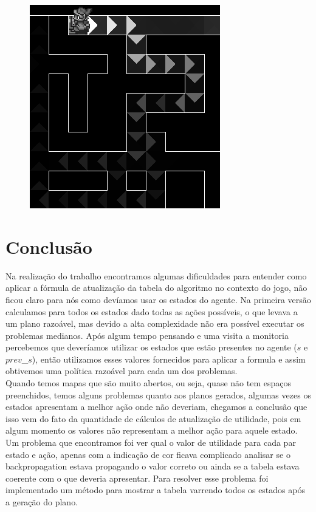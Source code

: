 \documentclass[letterpaper]{article}
\begin{document}
\begin{figure}[ht]
\centering
\includegraphics[scale=0.5]{medium.png}
\caption{}
\label{map_medium}
\end{figure}
\newpage{}
\section{Conclusão}

Na realização do trabalho encontramos algumas dificuldades para entender como aplicar a fórmula de atualização da tabela do algoritmo no contexto do jogo, não ficou claro para nós como devíamos usar os estados do agente. Na primeira versão calculamos para todos os estados dado todas as ações possíveis, o que levava a um plano razoável, mas devido a alta complexidade não era possível executar os problemas medianos. Após algum tempo pensando e uma visita a monitoria percebemos que deveríamos utilizar os estados que estão presentes no agente ($s$ e $prev$\_$s$), então utilizamos esses valores fornecidos para aplicar a formula e assim obtivemos uma política razoável para cada um dos problemas. \\
Quando temos mapas que são muito abertos, ou seja, quase não tem espaços preenchidos, temos alguns problemas quanto aos planos gerados, algumas vezes os estados apresentam a melhor ação onde não deveriam, chegamos a conclusão que isso vem do fato da quantidade de cálculos de atualização de utilidade, pois em algum momento os valores não representam a melhor ação para aquele estado. \\
Um problema que encontramos foi ver qual o valor de utilidade para cada par estado e ação, apenas com a indicação de cor ficava complicado analisar se o backpropagation estava propagando o valor correto ou ainda se a tabela estava coerente com o que deveria apresentar. Para resolver esse problema foi implementado um método para mostrar a tabela varrendo todos os estados após a geração do plano.
\end{document}
